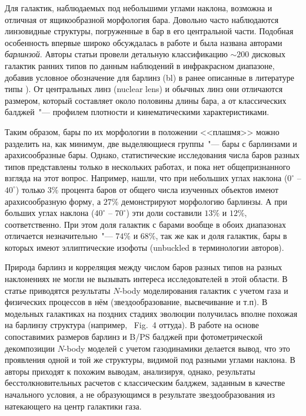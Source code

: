 \documentclass{trlnotes}
\begin{document}
Для галактик, наблюдаемых под небольшими углами наклона, возможна и отличная от ящикообразной морфология бара.
Довольно часто наблюдаются линзовидные структуры, погруженные в бар в его центральной части. Подобная особенность
впервые широко обсуждалась в работе \citet{laurikainen2011} и была названа авторами \emph{барлинзой}.
Авторы статьи провели детальную классификацию $\sim\!200$ дисковых галактик ранних типов по данным наблюдений в
инфракрасном диапазоне, добавив условное обозначение для барлинз (bl) в ранее описанные в литературе типы
\citep{devaucouleurs1959,buta2010}). От центральных линз (nuclear lens) и обычных линз они отличаются
размером, который составляет около половины длины бара, а от классических балджей~"--- профилем плотности и кинематическими
характеристиками. 

Таким образом, бары по их морфологии в положении <<плашмя>> можно разделить на, как минимум, две выделяющиеся группы~"--- бары с
барлинзами и арахисообразные бары. Однако, статистические исследования числа баров разных типов представлены только в нескольких работах, и пока нет общепризнанного взгляда на этот вопрос. Например, \citet{li2017a} нашли, что при  небольших углах наклона ($0^\circ$ -- $40^\circ$) только $3\%$ процента баров от общего числа изученных объектов имеют арахисообразную форму, а $27\%$ демонстрируют морфологию барлинзы. А при больших углах наклона ($40^\circ$
-- $70^\circ$) эти доли составили $13\%$ и $12\%$,  соответственно. При этом доля галактик с барами вообще в обоих диапазонах отличается незначительно~"--- $74\%$ и $68\%$, так же как и доля галактик, бары в которых имеют
эллиптические изофоты (unbuckled в терминологии авторов). 

Природа барлинз и корреляция между числом баров разных типов на разных наклонениях не могли не вызывать интереса
исследователей в этой области. В статье \citet{athanassoula2013a} приводятся результаты $N$-body моделирования галактик с учетом газа и физических процессов 
в нём (звездообразование, высвечивание и т.п). В модельных галактиках на поздних стадиях эволюции  получилась вполне похожая на барлинзу структура (например, ~Fig.~4 оттуда). В работе  \citet{athanassoula2015} на основе сопоставимих размеров барлинз и B/PS балджей при фотометрической 
декомпозиции $N$-body моделей с учетом газодинамики делается вывод, что это проявления одной и той же структуры, 
видимой под разными углами наклона. В \cite{salo2017} авторы приходят к похожим выводам, анализируя, 
однако, результаты бесстолкновительных расчетов с классическим балджем, заданным в качестве начального условия, а не образующимся в результате звездообразования из  натекающего на центр галактики газа. 
\end{document}
